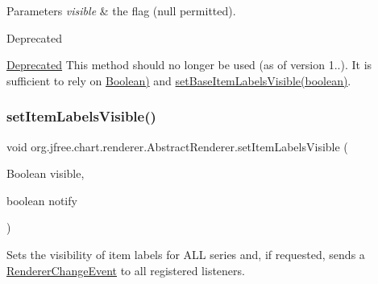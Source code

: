\begin{DoxyParams}{Parameters}
{\em visible} & the flag ({\ttfamily null} permitted).\\
\hline
\end{DoxyParams}
\begin{DoxyRefDesc}{Deprecated}
\item[\mbox{\hyperlink{deprecated__deprecated000129}{Deprecated}}]This method should no longer be used (as of version 1..). It is sufficient to rely on \mbox{\hyperlink{}{Boolean)}} and \mbox{\hyperlink{classorg_1_1jfree_1_1chart_1_1renderer_1_1_abstract_renderer_aef1e2688293f0bdb55b4c4cdaf0fde9c}{set\+Base\+Item\+Labels\+Visible(boolean)}}. \end{DoxyRefDesc}
\mbox{\label{classorg_1_1jfree_1_1chart_1_1renderer_1_1_abstract_renderer_a6946afbd4d7476711bd5c502a99cc9cc}} 
\subsubsection{\texorpdfstring{set\+Item\+Labels\+Visible()}{setItemLabelsVisible()}\hspace{0.1cm}{\footnotesize\ttfamily [3/3]}}
{\footnotesize\ttfamily void org.\+jfree.\+chart.\+renderer.\+Abstract\+Renderer.\+set\+Item\+Labels\+Visible (\begin{DoxyParamCaption}\item[{Boolean}]{visible,  }\item[{boolean}]{notify }\end{DoxyParamCaption})}

Sets the visibility of item labels for A\+LL series and, if requested, sends a \mbox{\hyperlink{}{Renderer\+Change\+Event}} to all registered listeners.


